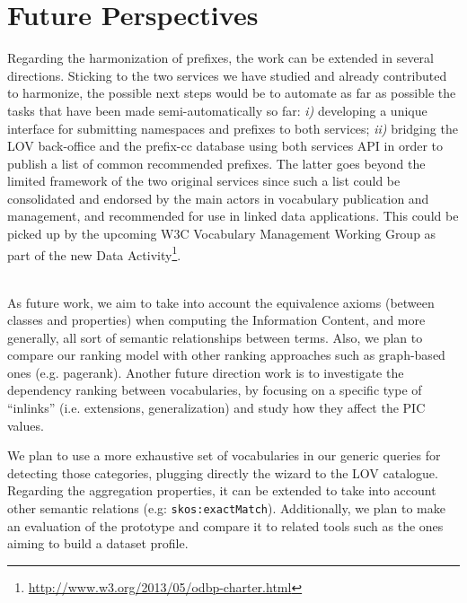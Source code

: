 \section{Future Perspectives}
\label{sec:nextSteps}
Regarding the harmonization of prefixes, the work can be extended in several directions. Sticking to the two services we have studied and already contributed to harmonize, the possible next steps would be to automate as far as possible the tasks that have been made semi-automatically so far: \emph{i)} developing a unique interface for submitting namespaces and prefixes to both services; \emph{ii)} bridging the LOV back-office and the prefix-cc database using both services API in order to publish a list of common recommended prefixes. The latter goes beyond the limited framework of the two original services since such a list could be consolidated and endorsed by the main actors in vocabulary publication and management, and recommended for use in linked data applications. This could be picked up by the upcoming W3C Vocabulary Management Working Group as part of the new Data Activity\footnote{\url{http://www.w3.org/2013/05/odbp-charter.html}}.

 \\
 As future work, we aim to take into account the equivalence axioms (between classes and properties) when computing the Information Content, and more generally, all sort of semantic relationships between terms. Also, we plan to compare our ranking model with other ranking approaches such as graph-based ones (e.g. pagerank). Another future direction work is to investigate the dependency ranking between vocabularies, by focusing on a specific type of ``inlinks'' (i.e. extensions, generalization) and study how they affect the PIC values.
 
 We plan to use a more exhaustive set of vocabularies in our generic queries for detecting those categories, plugging directly the wizard to the LOV catalogue. Regarding the aggregation properties, it can be extended to take into account other semantic relations (e.g: \texttt{skos:exactMatch}). Additionally, we plan to make an evaluation of the prototype and compare it to related tools such as the ones aiming to build a dataset profile.
 
